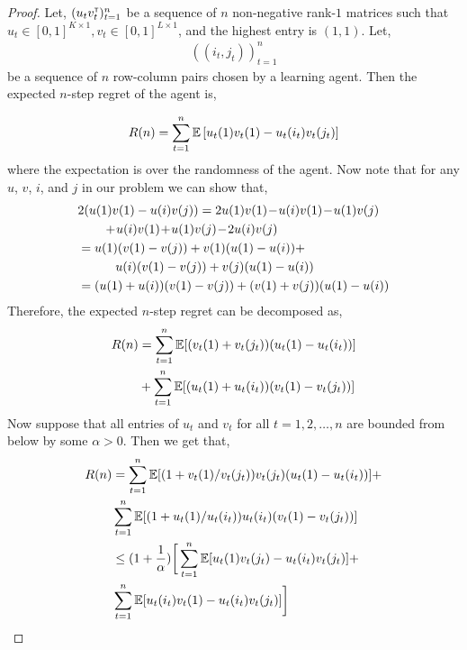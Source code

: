 \begin{proof}
Let, $(u_t v_t^\mathsf{\scriptscriptstyle T})_{t = 1}^n$ be a sequence of $n$ non-negative rank-$1$  matrices such that $u_t \in [0, 1]^{K \times 1}, v_t \in [0, 1]^{L \times 1}$, and the highest entry is $(1, 1)$. Let,
\begin{align*}
((i_t, j_t))_{t = 1}^n
\end{align*}
be a sequence of $n$ row-column pairs chosen by a learning agent. Then the expected $n$-step regret of the agent is,


\begin{align*}
R(n) = \sum_{t = 1}^n \mathbb{E} \left[{u_t(1) v_t(1) - u_t(i_t) v_t(j_t)}\right]
\end{align*}
where the expectation is over the randomness of the agent. Now note that for any $u$, $v$, $i$, and $j$ in our problem we can show that,
\begin{align*}
& 2 (u(1) v(1) - u(i) v(j)) =  2 u(1) v(1) \! - \! u(i) v(1) \! - \! u(1) v(j)\\
&  \hspace*{2em} + \! u(i) v(1) \! + \! u(1) v(j) \! - \! 2 u(i) v(j) \\
& = u(1) (v(1) - v(j))  + v(1) (u(1) -  u(i))  +\\
& \hspace*{3em}  u(i) (v(1)  - v(j))  + v(j) (u(1)  - u(i)) \\
& = (u(1) + u(i)) (v(1) - v(j)) + (v(1) + v(j)) (u(1) - u(i))
\end{align*}
Therefore, the expected $n$-step regret can be decomposed as,
\begin{align*}
R(n) &= \sum_{t = 1}^n \mathbb{E}[{(v_t(1) + v_t(j_t)) (u_t(1) - u_t(i_t))}] \\
&+ \sum_{t = 1}^n \mathbb{E}[{(u_t(1) + u_t(i_t)) (v_t(1) - v_t(j_t))}]
\end{align*}
Now suppose that all entries of $u_t$ and $v_t$ for all $t=1,2,\ldots, n$ are bounded from below by some $\alpha > 0$. Then we get that,
\begin{align*}
R(n)
& = \sum_{t = 1}^n \mathbb{E}[{(1 + v_t(1) / v_t(j_t)) v_t(j_t) (u_t(1) - u_t(i_t))}] +\\
&\sum_{t = 1}^n \mathbb{E}[{(1 + u_t(1) / u_t(i_t)) u_t(i_t) (v_t(1) - v_t(j_t))}] \\
& \leq (1 + \frac{1}{\alpha}) \bigg[\sum_{t = 1}^n \mathbb{E}[{u_t(1) v_t(j_t) - u_t(i_t) v_t(j_t)}] + \\
& \sum_{t = 1}^n \mathbb{E}[{u_t(i_t) v_t(1) - u_t(i_t) v_t(j_t)}]\bigg]
\end{align*}


\end{proof}
